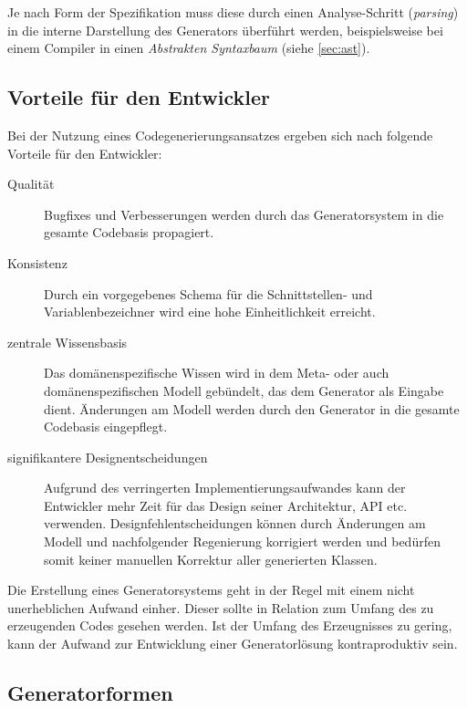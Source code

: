 Je nach Form der Spezifikation muss diese durch einen Analyse-Schritt (\emph{parsing}) in die interne Darstellung des Generators überführt werden, beispielsweise bei einem Compiler in einen \emph{Abstrakten Syntaxbaum} (siehe \cref{sec:ast}).

\subsection{Vorteile für den Entwickler}
\label{sec:advantages_for_the_developer}

Bei der Nutzung eines Codegenerierungsansatzes ergeben sich nach \cite[][S. 15]{herrington2003code} folgende Vorteile für den Entwickler:

\begin{description}
    \item[Qualität]
        Bugfixes und Verbesserungen werden durch das Generatorsystem in die gesamte Codebasis propagiert.
    \item[Konsistenz]
        Durch ein vorgegebenes Schema für die Schnittstellen- und Variablenbezeichner wird eine hohe Einheitlichkeit erreicht.
    \item[zentrale Wissensbasis]
        Das domänenspezifische Wissen wird in dem Meta- oder auch domänenspezifischen Modell gebündelt, das dem Generator als Eingabe dient. Änderungen am Modell werden durch den Generator in die gesamte Codebasis eingepflegt.
    \item[signifikantere Designentscheidungen]
        Aufgrund des verringerten Implementierungsaufwandes kann der Entwickler mehr Zeit für das Design seiner Architektur, \gls{API} etc. verwenden. Designfehlentscheidungen können durch Änderungen am Modell und nachfolgender Regenierung korrigiert werden und bedürfen somit keiner manuellen Korrektur aller generierten Klassen.
\end{description}

Die Erstellung eines Generatorsystems geht in der Regel mit einem nicht unerheblichen Aufwand einher. Dieser sollte in Relation zum Umfang des zu erzeugenden Codes gesehen werden.
Ist der Umfang des Erzeugnisses zu gering, kann der Aufwand zur Entwicklung einer Generatorlösung kontraproduktiv sein.

\subsection{Generatorformen}
\label{sec:generator_models}

